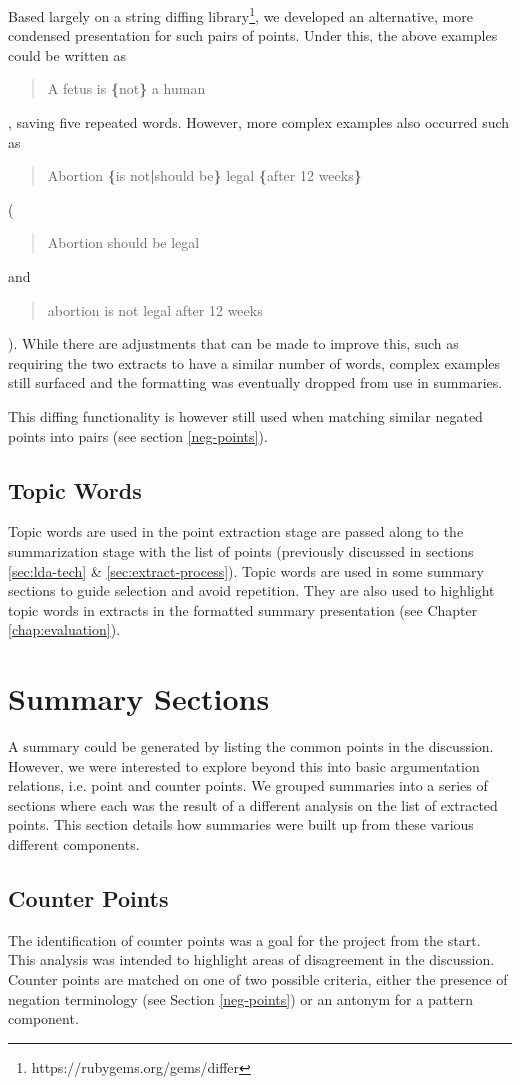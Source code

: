       Based largely on a string diffing library\footnote{https://rubygems.org/gems/differ}, we developed an alternative, more condensed presentation for such pairs of points. Under this, the above examples could be written as \blockquote{A fetus is \textbf{\{}not\textbf{\}} a human}, saving five repeated words. However, more complex examples also occurred such as \blockquote{Abortion \textbf{\{}is not\textbf{|}should be\textbf{\}} legal \textbf{\{}after 12 weeks\textbf{\}}} (\blockquote{Abortion should be legal} and \blockquote{abortion is not legal after 12 weeks}). While there are adjustments that can be made to improve this, such as requiring the two extracts to have a similar number of words, complex examples still surfaced and the formatting was eventually dropped from use in summaries.

      This diffing functionality is however still used when matching similar negated points into pairs (see section \ref{neg-points}).

  \tocless\subsection{Topic Words}
  Topic words are used in the point extraction stage are passed along to the summarization stage with the list of points (previously discussed in sections \ref{sec:lda-tech} \& \ref{sec:extract-process}). Topic words are used in some summary sections to guide selection and avoid repetition. They are also used to highlight topic words in extracts in the formatted summary presentation (see Chapter \ref{chap:evaluation}).

  \section{Summary Sections}
    A summary could be generated by listing the common points in the discussion. However, we were interested to explore beyond this into basic argumentation relations, i.e. point and counter points. We grouped summaries into a series of sections where each was the result of a different analysis on the list of extracted points. This section details how summaries were built up from these various different components.

    \subsection{Counter Points}
      The identification of counter points was a goal for the project from the start. This analysis was intended to highlight areas of disagreement in the discussion. Counter points are matched on one of two possible criteria, either the presence of negation terminology (see Section \ref{neg-points}) or an antonym for a pattern component.

